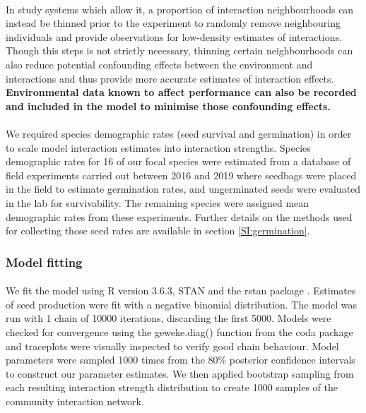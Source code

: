 \begin{refsection}
        \paragraph{}
    	In study systems which allow it, a proportion of interaction neighbourhoods can instead be thinned prior to the experiment to randomly remove neighbouring individuals and provide observations for low-density estimates of interactions. Though this steps is not strictly necessary, thinning certain neighbourhoods can also reduce potential confounding effects between the environment and interactions and thus provide more accurate estimates of interaction effects. \textbf{Environmental data known to affect performance can also be recorded and included in the model \parencite{Bimler2018} to minimise those confounding effects.}

        \paragraph{} 
        We required species demographic rates (seed survival and germination) in order to scale model interaction estimates into interaction strengths. Species demographic rates for 16 of our focal species were estimated from a database of field experiments carried out between 2016 and 2019 where seedbags were placed in the field to estimate germination rates, and ungerminated seeds were evaluated in the lab for survivability.  The remaining species were assigned mean demographic rates from these experiments. Further details on the methods used for collecting those seed rates are available in section \ref{SI:germination}.

        \subsubsection{Model fitting}

        \paragraph{}
        We fit the model using R version 3.6.3, STAN and the rstan package \parencite{R2020, Carpenter2017, Rstan2020}. Estimates of seed production were fit with a negative binomial distribution. The model was run with 1 chain of 10000 iterations, discarding the first 5000. Models were checked for convergence using the geweke.diag() function from the coda package \parencite{Plummer2006} and traceplots were visually inspected to verify good chain behaviour. Model parameters were sampled 1000 times from the 80\% posterior confidence intervals to construct our parameter estimates. We then applied bootstrap sampling from each resulting interaction strength distribution to create 1000 samples of the community interaction network.


\end{refsection}
